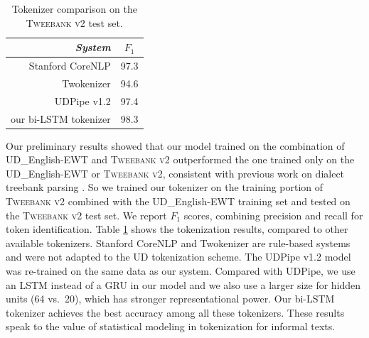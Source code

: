 \documentclass[11pt,a4paper]{article}
\newcommand{\nss}[1]{\textcolor{magenta}{[$_\mathrm{S}^\mathrm{NS}$#1]}}
\begin{document}
\begin{table}[t]
	\centering
	\begin{tabular}{rc}
		\it System & $F_1$ \\
		\hline
		  Stanford CoreNLP & 97.3 \\
		 Twokenizer & 94.6 \\
		\hdashline
		UDPipe v1.2 & 97.4 \\
	 	our bi-LSTM tokenizer & 98.3 \\
	\end{tabular}
	\caption{Tokenizer comparison on the \textsc{Tweebank v2} test set.}\label{tbl:tok-result}
\end{table}
Our preliminary results
showed that our model trained on
the combination of UD\_English-EWT and \textsc{Tweebank v2}
outperformed the one trained only on the UD\_English-EWT or \textsc{Tweebank v2},
consistent with previous work on dialect treebank parsing \cite{wang-EtAl:2017:Long6}.
So we trained our tokenizer on the training portion of
\textsc{Tweebank v2} combined with the UD\_English-EWT training set
and tested on the \textsc{Tweebank v2} test set. %
We report $F_1$ scores, combining precision and recall for token identification. Table \ref{tbl:tok-result} shows the
tokenization results, compared to  other available tokenizers. 
 Stanford CoreNLP \cite{manning-EtAl:2014:P14-5} and Twokenizer
\cite{ICWSM101540} are rule-based systems and were not adapted
to the UD tokenization scheme.
The UDPipe v1.2
\cite{straka-strakova:2017:K17-3} model was re-trained on the same
data as our system. Compared with UDPipe, we use an LSTM
instead of a GRU in our model and we also use a larger size for hidden units (64 vs.~20),
which has stronger representational power. 
Our bi-LSTM tokenizer achieves the best accuracy among all these
tokenizers.  These results speak to the value of statistical modeling
in tokenization for informal texts.%
\end{document}
